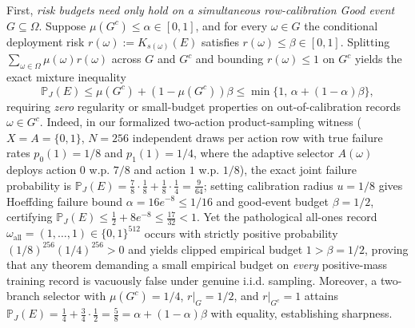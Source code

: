 \documentclass[11pt,a4paper]{article}
\begin{document}
First, \emph{risk budgets need only hold on a simultaneous
row-calibration Good event \(G \subseteq \Omega\)}. Suppose
\(\mu(G^c) \le \alpha \in [0,1]\), and for every \(\omega \in G\) the
conditional deployment risk \(r(\omega) := K_{s(\omega)}(E)\) satisfies
\(r(\omega) \le \beta \in [0,1]\). Splitting
\(\sum_{\omega \in \Omega} \mu(\omega) r(\omega)\) across \(G\) and
\(G^c\) and bounding \(r(\omega) \le 1\) on \(G^c\) yields the exact
mixture inequality
\[\mathbb{P}_J(E) \le \mu(G^c) + (1 - \mu(G^c))\beta \le \min\{1,\, \alpha + (1 - \alpha)\beta\},\]
requiring \emph{zero} regularity or small-budget properties on
out-of-calibration records \(\omega \in G^c\). Indeed, in our formalized
two-action product-sampling witness (\(X = A = \{0,1\}\), \(N = 256\)
independent draws per action row with true failure rates
\(p_0(1) = 1/8\) and \(p_1(1) = 1/4\), where the adaptive selector
\(A(\omega)\) deploys action \(0\) w.p. \(7/8\) and action \(1\) w.p.
\(1/8\)), the exact joint failure probability is
\(\mathbb{P}_J(E) = \frac{7}{8}\cdot\frac{1}{8} + \frac{1}{8}\cdot\frac{1}{4} = \frac{9}{64}\);
setting calibration radius \(u = 1/8\) gives Hoeffding failure bound
\(\alpha = 16 e^{-8} \le 1/16\) and good-event budget \(\beta = 1/2\),
certifying
\(\mathbb{P}_J(E) \le \frac{1}{2} + 8 e^{-8} \le \frac{17}{32} < 1\).
Yet the pathological all-ones record
\(\omega_{\mathrm{all}} = (1, \dots, 1) \in \{0,1\}^{512}\) occurs with
strictly positive probability \((1/8)^{256}(1/4)^{256} > 0\) and yields
clipped empirical budget \(1 > \beta = 1/2\), proving that any theorem
demanding a small empirical budget on \emph{every} positive-mass
training record is vacuously false under genuine i.i.d. sampling.
Moreover, a two-branch selector with \(\mu(G^c) = 1/4\), \(r|_G = 1/2\),
and \(r|_{G^c} = 1\) attains
\(\mathbb{P}_J(E) = \frac{1}{4} + \frac{3}{4}\cdot\frac{1}{2} = \frac{5}{8} = \alpha + (1-\alpha)\beta\)
with equality, establishing sharpness.
\end{document}

